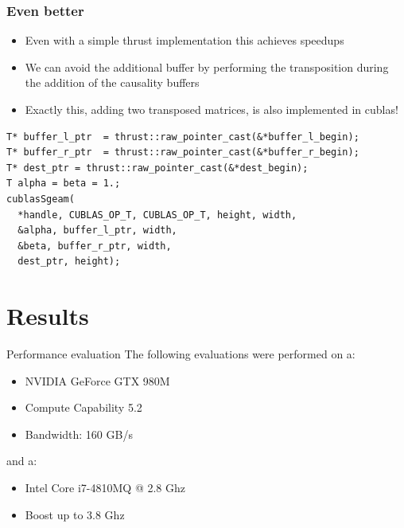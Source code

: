 \documentclass{beamer}
\begin{document}
\begin{frame}[fragile]
  \frametitle{Even better}
  \begin{itemize}
    \item Even with a simple thrust implementation this achieves speedups
    \item We can avoid the additional buffer by performing the transposition
      during the addition of the causality buffers
    \item Exactly this, adding two transposed matrices, is also implemented
      in cublas!
  \end{itemize}
  \begin{lstlisting}[basicstyle=\tiny]
T* buffer_l_ptr  = thrust::raw_pointer_cast(&*buffer_l_begin);
T* buffer_r_ptr  = thrust::raw_pointer_cast(&*buffer_r_begin);
T* dest_ptr = thrust::raw_pointer_cast(&*dest_begin);
T alpha = beta = 1.;
cublasSgeam(
  *handle, CUBLAS_OP_T, CUBLAS_OP_T, height, width,
  &alpha, buffer_l_ptr, width,
  &beta, buffer_r_ptr, width,
  dest_ptr, height);
  \end{lstlisting}
\end{frame}

\section{Results} 
\begin{frame}{Performance evaluation}
  The following evaluations were performed on a:
  \begin{itemize}
    \item NVIDIA GeForce GTX 980M
    \item Compute Capability 5.2
    \item Bandwidth: 160 GB/s
  \end{itemize}
  and a:
  \begin{itemize}
    \item Intel Core i7-4810MQ @ 2.8 Ghz
    \item Boost up to 3.8 Ghz
  \end{itemize}
\end{frame} 
\end{document}
